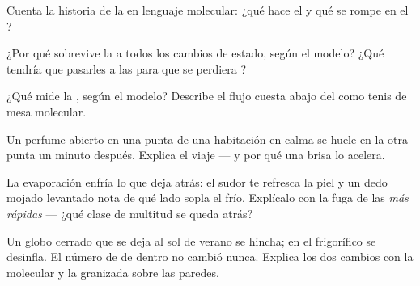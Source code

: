 \begin{exercise}[$\star$]\label{exo:g7:states-of-matter:5}
Cuenta la historia de la  en lenguaje molecular: ¿qué hace el
 y qué se rompe en el ?
\end{exercise}

\begin{exercise}[$\star$]\label{exo:g7:states-of-matter:6}
¿Por qué sobrevive la  a todos los cambios de estado, según el
modelo? ¿Qué tendría que pasarles a las  para que se
perdiera ?
\end{exercise}

\begin{exercise}[$\star$]\label{exo:g7:states-of-matter:7}
¿Qué mide la , según el modelo? Describe el flujo
cuesta abajo del  como tenis de mesa molecular.
\end{exercise}

\begin{exercise}[$\star$]\label{exo:g7:states-of-matter:8}
Un perfume abierto en una punta de una habitación en calma se huele en
la otra punta un minuto después. Explica el viaje --- y por qué una
brisa lo acelera.
\end{exercise}

\begin{exercise}[$\star\star$]\label{exo:g7:states-of-matter:9}
La evaporación enfría lo que deja atrás: el sudor te refresca la piel
y un dedo mojado levantado nota de qué lado sopla el  frío.
Explícalo con la fuga de las  \emph{más rápidas} --- ¿qué
clase de multitud se queda atrás?
\end{exercise}

\begin{exercise}[$\star\star$]\label{exo:g7:states-of-matter:10}
Un globo cerrado que se deja al sol de verano se hincha; en el
frigorífico se desinfla. El número de  de dentro no
cambió nunca. Explica los dos cambios con la  molecular y
la granizada sobre las paredes.
\end{exercise}

